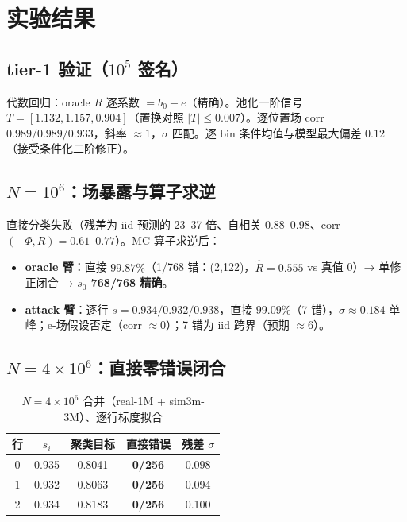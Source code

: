 \documentclass[11pt,a4paper]{ctexart}
\begin{document}
\section{实验结果}\label{sec:results}

\subsection{tier-1 验证（$10^5$ 签名）}

代数回归：oracle $R$ 逐系数 $= b_0-e$（精确）。池化一阶信号 $T = [1.132, 1.157, 0.904]$（置换对照 $|T|\le0.007$）。逐位置场 corr $0.989/0.989/0.933$，斜率 $\approx1$，$\sigma$ 匹配。逐 bin 条件均值与模型最大偏差 $0.12$（接受条件化二阶修正）。

\subsection{$N=10^6$：场暴露与算子求逆}

直接分类失败（残差为 iid 预测的 23--37 倍、自相关 0.88--0.98、corr$(-\Phi,R)=0.61$--$0.77$）。MC 算子求逆后：
\begin{itemize}
\item \textbf{oracle 臂}：直接 $99.87\%$（1/768 错：(2,122)，$\hat R=0.555$ vs 真值 0）→ 单修正闭合 → \textbf{$s_0$ 768/768 精确}。
\item \textbf{attack 臂}：逐行 $s=0.934/0.932/0.938$，直接 $99.09\%$（7 错），$\sigma\approx0.184$ 单峰；e-场假设否定（corr $\approx0$）；7 错为 iid 跨界（预期 $\approx6$）。
\end{itemize}

\subsection{$N=4\times10^6$：直接零错误闭合}

\begin{table}[htbp]
\centering
\caption{$N=4\times10^6$ 合并（real-1M + sim3m-3M）、逐行标度拟合}
\begin{tabular}{ccccc}
\toprule
行 & $s_i$ & 聚类目标 & 直接错误 & 残差 $\sigma$ \\
\midrule
0 & 0.935 & 0.8041 & \textbf{0/256} & 0.098 \\
1 & 0.932 & 0.8063 & \textbf{0/256} & 0.094 \\
2 & 0.934 & 0.8183 & \textbf{0/256} & 0.100 \\
\bottomrule
\end{tabular}
\end{table}
\end{document}
